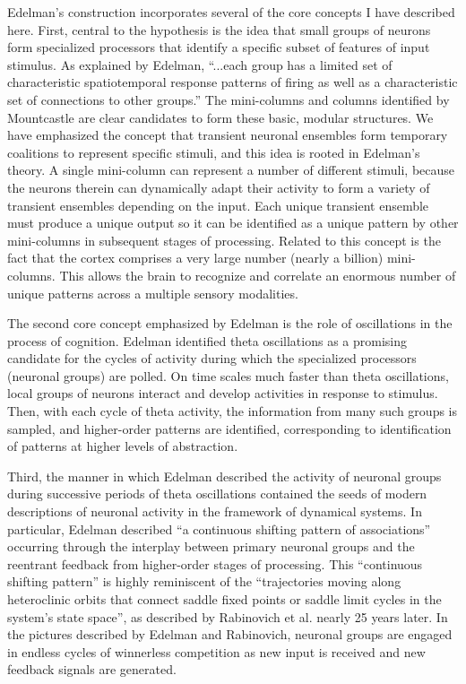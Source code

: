 Edelman's construction incorporates several of the core concepts I have described here. First, central to the hypothesis is the idea that small groups of neurons form specialized processors that identify a specific subset of features of input stimulus. As explained by Edelman, ``...each group has a limited set of characteristic spatiotemporal response patterns of firing as well as a characteristic set of connections to other groups.'' The mini-columns and columns identified by Mountcastle are clear candidates to form these basic, modular structures. We have emphasized the concept that transient neuronal ensembles form temporary coalitions to represent specific stimuli, and this idea is rooted in Edelman's theory. A single mini-column can represent a number of different stimuli, because the neurons therein can dynamically adapt their activity to form a variety of transient ensembles depending on the input. Each unique transient ensemble must produce a unique output so it can be identified as a unique pattern by other mini-columns in subsequent stages of processing. Related to this concept is the fact that the cortex comprises a very large number (nearly a billion) mini-columns. This allows the brain to recognize and correlate an enormous number of unique patterns across a multiple sensory modalities.

The second core concept emphasized by Edelman is the role of oscillations in the process of cognition. Edelman identified theta oscillations as a promising candidate for the cycles of activity during which the specialized processors (neuronal groups) are polled. On time scales much faster than theta oscillations, local groups of neurons interact and develop activities in response to stimulus. Then, with each cycle of theta activity, the information from many such groups is sampled, and higher-order patterns are identified, corresponding to identification of patterns at higher levels of abstraction. 

Third, the manner in which Edelman described the activity of neuronal groups during successive periods of theta oscillations contained the seeds of modern descriptions of neuronal activity in the framework of dynamical systems. In particular, Edelman described ``a continuous shifting pattern of associations'' occurring through the interplay between primary neuronal groups and the reentrant feedback from higher-order stages of processing. This ``continuous shifting pattern'' is highly reminiscent of the ``trajectories moving along heteroclinic orbits that connect saddle fixed points or saddle limit cycles in the system's state space'', as described by Rabinovich et al. \cite{ravo2001} nearly 25 years later. In the pictures described by Edelman and Rabinovich, neuronal groups are engaged in endless cycles of winnerless competition as new input is received and new feedback signals are generated.

